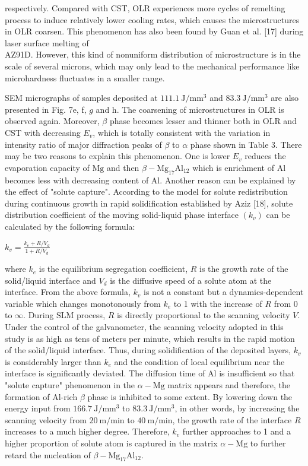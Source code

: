\documentclass[10pt]{article}
\begin{document}
respectively. Compared with CST, OLR experiences more cycles of remelting process to induce relatively lower cooling rates, which causes the microstructures in OLR coarsen. This phenomenon has also been found by Guan et al. [17] during laser surface melting of\\
AZ91D. However, this kind of nonuniform distribution of microstructure is in the scale of several microns, which may only lead to the mechanical performance like microhardness fluctuates in a smaller range.

SEM micrographs of samples deposited at $111.1 \mathrm{~J} / \mathrm{mm}^{3}$ and $83.3 \mathrm{~J} / \mathrm{mm}^{3}$ are also presented in Fig. 7e, f, $g$ and $\mathrm{h}$. The coarsening of microstructures in OLR is observed again. Moreover, $\beta$ phase becomes lesser and thinner both in OLR and CST with decreasing $E_{v}$, which is totally consistent with the variation in intensity ratio of major diffraction peaks of $\beta$ to $\alpha$ phase shown in Table 3. There may be two reasons to explain this phenomenon. One is lower $E_{v}$ reduces the evaporation capacity of $\mathrm{Mg}$ and then $\beta-\mathrm{Mg}_{17} \mathrm{Al}_{12}$ which is enrichment of $\mathrm{Al}$ becomes less with decreasing content of $\mathrm{Al}$. Another reason can be explained by the effect of "solute capture". According to the model for solute redistribution during continuous growth in rapid solidification established by Aziz [18], solute distribution coefficient of the moving solid-liquid phase interface $\left(k_{v}\right)$ can be calculated by the following formula:

$k_{v}=\frac{k_{e}+R / V_{d}}{1+R / V_{d}}$

where $k_{e}$ is the equilibrium segregation coefficient, $R$ is the growth rate of the solid/liquid interface and $V_{d}$ is the diffusive speed of a solute atom at the interface. From the above formula, $k_{v}$ is not a constant but a dynamics-dependent variable which changes monotonously from $k_{e}$ to 1 with the increase of $R$ from 0 to $\infty$. During SLM process, $R$ is directly proportional to the scanning velocity $V$. Under the control of the galvanometer, the scanning velocity adopted in this study is as high as tens of meters per minute, which results in the rapid motion of the solid/liquid interface. Thus, during solidification of the deposited layers, $k_{v}$ is considerably larger than $k_{e}$ and the condition of local equilibrium near the interface is significantly deviated. The diffusion time of $\mathrm{Al}$ is insufficient so that "solute capture" phenomenon in the $\alpha-\mathrm{Mg}$ matrix appears and therefore, the formation of Al-rich $\beta$ phase is inhibited to some extent. By lowering down the energy input from $166.7 \mathrm{~J} / \mathrm{mm}^{3}$ to $83.3 \mathrm{~J} / \mathrm{mm}^{3}$, in other words, by increasing the scanning velocity from $20 \mathrm{~m} / \mathrm{min}$ to $40 \mathrm{~m} / \mathrm{min}$, the growth rate of the interface $R$ increases to a much higher degree. Therefore, $k_{v}$ further approaches to 1 and a higher proportion of solute atom is captured in the matrix $\alpha-\mathrm{Mg}$ to further retard the nucleation of $\beta-\mathrm{Mg}_{17} \mathrm{Al}_{12}$.
\end{document}
